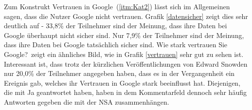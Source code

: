 Zum Konstrukt \glqq Vertrauen in Google\grqq\ (\ref{itm:Kat2}) lässt sich im Allgemeinen sagen, dass die Nutzer Google nicht vertrauen. Grafik \ref{datensicher} zeigt dies sehr deutlich auf - 33,8\% der Teilnehmer sind der Meinung, dass ihre Daten bei Google überhaupt nicht sicher sind. Nur 7,9\% der Teilnehmer sind der Meinung, dass ihre Daten bei Google tatsächlich sicher sind. \glqq Wie stark vertrauen Sie Google?\grqq\ zeigt ein ähnliches Bild, wie in Grafik \ref{vertrauen} sehr gut zu sehen ist. Interessant ist, dass trotz der kürzlichen Veröffentlichungen von Edward Snowden nur 20,0\% der Teilnehmer angegeben haben, dass es in der Vergangenheit ein Ereignis gab, welches ihr Vertrauen in Google stark beeinflusst hat. Diejenigen, die mit Ja geantwortet haben, haben in dem Kommentarfeld dennoch sehr häufig Antworten gegeben die mit der NSA zusammenhängen.

